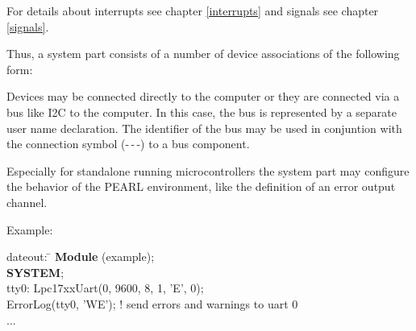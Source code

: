 \begin{added}




 
For details about interrupts see chapter \ref{interrupts} and 
signals see chapter \ref{signals}.

Thus, a system part consists of a number of device associations of the
following form:

Devices may be connected directly to the computer or they are connected 
via a bus like I2C to the computer. In this case, the bus is represented
by a separate user name declaration. The identifier of the bus may
be used in conjuntion with the connection symbol (-\,-\,-) to
a bus component.

Especially for standalone running microcontrollers the system part
may configure the behavior of the PEARL environment, like the
definition of an error output channel. 



Example:
\begin{tabbing}
\x dateout: \= \kill
{\bf Module} (example); \> \\
{\bf SYSTEM}; \> \\
\x tty0:    \> Lpc17xxUart(0, 9600, 8, 1, 'E', 0);\\
\x  \> ErrorLog(tty0, 'WE'); ! send errors and warnings to uart 0\\
\x ...
\end{tabbing}

\end{added}

